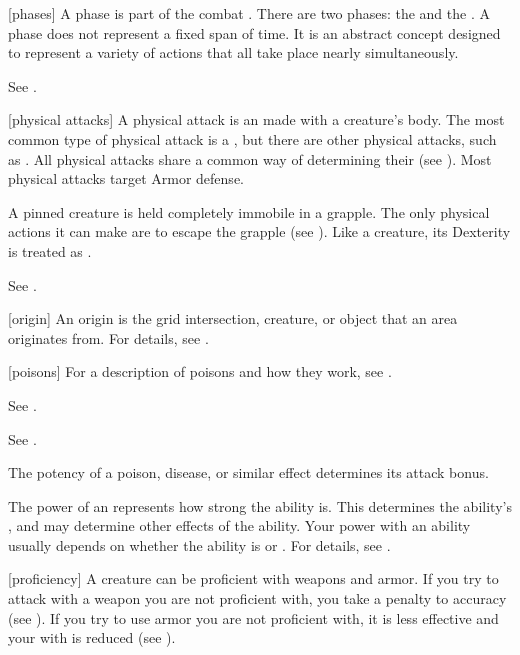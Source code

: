 [phases] A phase is part of the combat .
There are two phases: the  and the .
A phase does not represent a fixed span of time.
It is an abstract concept designed to represent a variety of actions that all take place nearly simultaneously.

 See .

[physical attacks] A physical attack is an  made with a creature's body.
The most common type of physical attack is a , but there are other physical attacks, such as .
All physical attacks share a common way of determining their  (see ).
Most physical attacks target Armor defense.

 A pinned creature is held completely immobile in a grapple.
The only physical actions it can make are to escape the grapple (see ).
Like a  creature, its Dexterity is treated as .

 See .

[origin] An origin is the grid intersection, creature, or object that an area originates from.
For details, see .

[poisons] For a description of poisons and how they work, see .

 See .

 See .

 The potency of a poison, disease, or similar effect determines its attack bonus.

 The power of an  represents how strong the ability is.
This determines the ability's , and may determine other effects of the ability.
Your power with an ability usually depends on whether the ability is  or .
For details, see .

[proficiency] A creature can be proficient with weapons and armor.
If you try to attack with a weapon you are not proficient with, you take a  penalty to accuracy (see ).
If you try to use armor you are not proficient with, it is less effective and your  with  is reduced (see ).


